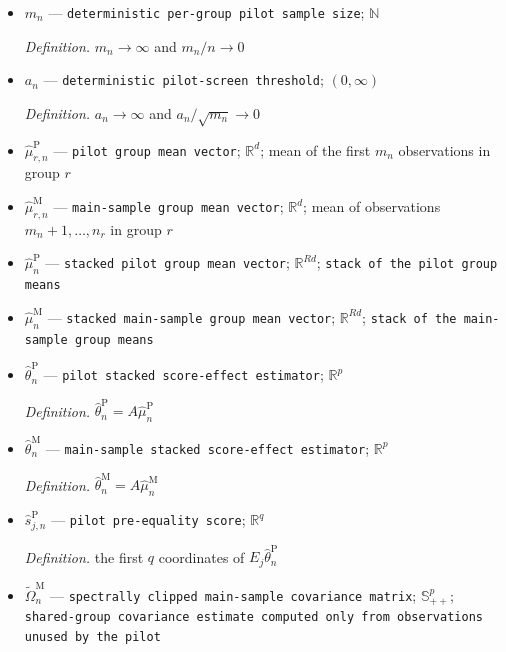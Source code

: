 \documentclass{article}
\begin{document}
\begin{itemize}
  \par\smallskip\noindent\emph{Definition.} \(\mathcal E_n^{\mathrm{mean}}=\{\mathcal L_{\mathbb P_{n,\eta}}(((\sqrt n\,\widehat s_{j,n})_{j\in\mathcal J},(\widehat b_{j,n})_{j\in\mathcal J})):\eta\in\mathcal K\}\)
  \item \(m_n\) --- \texttt{deterministic per-\allowbreak{}group pilot sample size}; \(\mathbb N\)
  \par\smallskip\noindent\emph{Definition.} \(m_n\to\infty\) and \(m_n/n\to0\)
  \item \(a_n\) --- \texttt{deterministic pilot-\allowbreak{}screen threshold}; \((0,\infty)\)
  \par\smallskip\noindent\emph{Definition.} \(a_n\to\infty\) and \(a_n/\sqrt{m_n}\to0\)
  \item \(\widehat\mu_{r,n}^{\mathrm P}\) --- \texttt{pilot group mean vector}; \(\mathbb R^d\); mean of the first \(m_n\) observations in group \(r\)
  \item \(\widehat\mu_{r,n}^{\mathrm M}\) --- \texttt{main-\allowbreak{}sample group mean vector}; \(\mathbb R^d\); mean of observations \(m_n+1,\ldots,n_r\) in group \(r\)
  \item \(\widehat\mu_n^{\mathrm P}\) --- \texttt{stacked pilot group mean vector}; \(\mathbb R^{Rd}\); \texttt{stack of the pilot group means}
  \item \(\widehat\mu_n^{\mathrm M}\) --- \texttt{stacked main-\allowbreak{}sample group mean vector}; \(\mathbb R^{Rd}\); \texttt{stack of the main-\allowbreak{}sample group means}
  \item \(\widehat\theta_n^{\mathrm P}\) --- \texttt{pilot stacked score-\allowbreak{}effect estimator}; \(\mathbb R^p\)
  \par\smallskip\noindent\emph{Definition.} \(\widehat\theta_n^{\mathrm P}=A\widehat\mu_n^{\mathrm P}\)
  \item \(\widehat\theta_n^{\mathrm M}\) --- \texttt{main-\allowbreak{}sample stacked score-\allowbreak{}effect estimator}; \(\mathbb R^p\)
  \par\smallskip\noindent\emph{Definition.} \(\widehat\theta_n^{\mathrm M}=A\widehat\mu_n^{\mathrm M}\)
  \item \(\widehat s_{j,n}^{\mathrm P}\) --- \texttt{pilot pre-\allowbreak{}equality score}; \(\mathbb R^q\)
  \par\smallskip\noindent\emph{Definition.} the first \(q\) coordinates of \(E_j\widehat\theta_n^{\mathrm P}\)
  \item \(\widetilde\Omega_n^{\mathrm M}\) --- \texttt{spectrally clipped main-\allowbreak{}sample covariance matrix}; \(\mathbb S_{++}^p\); \texttt{shared-\allowbreak{}group covariance estimate computed only from observations unused by the pilot}

\end{itemize}
\end{document}
